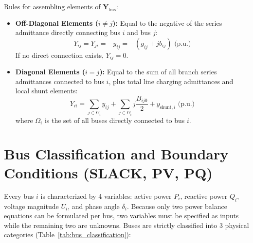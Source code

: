 \documentclass[12pt,a4paper,oneside]{report}
\begin{document}
\noindent Rules for assembling elements of $\mathbf{Y}_{\text{bus}}$:
\begin{itemize}
    \item \textbf{Off-Diagonal Elements ($i \ne j$):} Equal to the negative of the series admittance directly connecting bus $i$ and bus $j$:
    \begin{equation}
    Y_{ij} = Y_{ji} = - y_{ij} = - (g_{ij} + j b_{ij})\text{ (p.u.)}
    \end{equation}
    If no direct connection exists, $Y_{ij} = 0$.
    \item \textbf{Diagonal Elements ($i = j$):} Equal to the sum of all branch series admittances connected to bus $i$, plus total line charging admittances and local shunt elements:
    \begin{equation}
    Y_{ii} = \sum_{j \in \Omega_i} y_{ij} + \sum_{j \in \Omega_i} j \frac{B_{ij0}}{2} + y_{\text{shunt}, i}\text{ (p.u.)}
    \end{equation}
    where $\Omega_i$ is the set of all buses directly connected to bus $i$.
\end{itemize}

\section{Bus Classification and Boundary Conditions (SLACK, PV, PQ)}
Every bus $i$ is characterized by 4 variables: active power $P_i$, reactive power $Q_i$, voltage magnitude $U_i$, and phase angle $\delta_i$. Because only two power balance equations can be formulated per bus, two variables must be specified as inputs while the remaining two are unknowns. Buses are strictly classified into 3 physical categories (Table~\ref{tab:bus_classification}):
\end{document}
